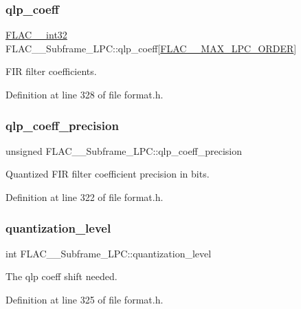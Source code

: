 \subsubsection{\texorpdfstring{qlp\_coeff}{qlp\_coeff}}
{\footnotesize\ttfamily \mbox{\hyperlink{ordinals_8h_a33fd77bfe6d685541a0c034a75deccdc}{F\+L\+A\+C\+\_\+\+\_\+int32}} F\+L\+A\+C\+\_\+\+\_\+\+Subframe\+\_\+\+L\+P\+C\+::qlp\+\_\+coeff\mbox{[}\mbox{\hyperlink{group__flac__format_ga16108d413f524329f338cff6e05f3aff}{F\+L\+A\+C\+\_\+\+\_\+\+M\+A\+X\+\_\+\+L\+P\+C\+\_\+\+O\+R\+D\+ER}}\mbox{]}}

F\+IR filter coefficients. 

Definition at line 328 of file format.\+h.

\mbox{\label{struct_f_l_a_c_____subframe___l_p_c_a6123b031203f603eba966b95fd2ad855}} 
\subsubsection{\texorpdfstring{qlp\_coeff\_precision}{qlp\_coeff\_precision}}
{\footnotesize\ttfamily unsigned F\+L\+A\+C\+\_\+\+\_\+\+Subframe\+\_\+\+L\+P\+C\+::qlp\+\_\+coeff\+\_\+precision}

Quantized F\+IR filter coefficient precision in bits. 

Definition at line 322 of file format.\+h.

\mbox{\label{struct_f_l_a_c_____subframe___l_p_c_aedcf1a3e5e62485e7ce250eda1f3e588}} 
\subsubsection{\texorpdfstring{quantization\_level}{quantization\_level}}
{\footnotesize\ttfamily int F\+L\+A\+C\+\_\+\+\_\+\+Subframe\+\_\+\+L\+P\+C\+::quantization\+\_\+level}

The qlp coeff shift needed. 

Definition at line 325 of file format.\+h.

\mbox{\label{struct_f_l_a_c_____subframe___l_p_c_acae4d0d439ea8900c5771eb967aec9bf}} 
